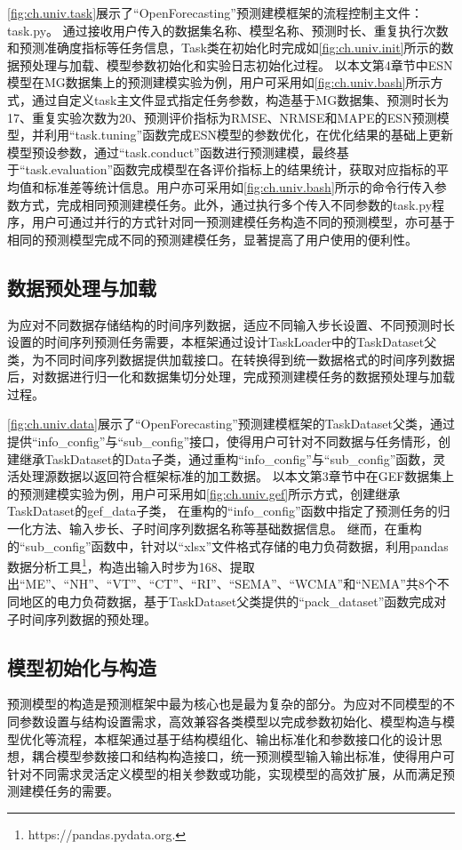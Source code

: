 \autoref{fig:ch.univ.task}展示了“OpenForecasting”预测建模框架的流程控制主文件：task.py。
通过接收用户传入的数据集名称、模型名称、预测时长、重复执行次数和预测准确度指标等任务信息，Task类在初始化时完成如\autoref{fig:ch.univ.init}所示的数据预处理与加载、模型参数初始化和实验日志初始化过程。
以本文第4章节中ESN模型在MG数据集上的预测建模实验为例，用户可采用如\autoref{fig:ch.univ.bash}所示方式，通过自定义task主文件显式指定任务参数，构造基于MG数据集、预测时长为17、重复实验次数为20、预测评价指标为RMSE、NRMSE和MAPE的ESN预测模型，并利用“task.tuning”函数完成ESN模型的参数优化，在优化结果的基础上更新模型预设参数，通过“task.conduct”函数进行预测建模，最终基于“task.evaluation”函数完成模型在各评价指标上的结果统计，获取对应指标的平均值和标准差等统计信息。用户亦可采用如\autoref{fig:ch.univ.bash}所示的命令行传入参数方式，完成相同预测建模任务。此外，通过执行多个传入不同参数的task.py程序，用户可通过并行的方式针对同一预测建模任务构造不同的预测模型，亦可基于相同的预测模型完成不同的预测建模任务，显著提高了用户使用的便利性。

\subsection{数据预处理与加载}
为应对不同数据存储结构的时间序列数据，适应不同输入步长设置、不同预测时长设置的时间序列预测任务需要，本框架通过设计TaskLoader中的TaskDataset父类，为不同时间序列数据提供加载接口。在转换得到统一数据格式的时间序列数据后，对数据进行归一化和数据集切分处理，完成预测建模任务的数据预处理与加载过程。


\autoref{fig:ch.univ.data}展示了“OpenForecasting”预测建模框架的TaskDataset父类，通过提供“info_config”与“sub_config”接口，使得用户可针对不同数据与任务情形，创建继承TaskDataset的Data子类，通过重构“info_config”与“sub_config”函数，灵活处理源数据以返回符合框架标准的加工数据。
以本文第3章节中在GEF数据集上的预测建模实验为例，用户可采用如\autoref{fig:ch.univ.gef}所示方式，创建继承TaskDataset的gef_data子类，
在重构的“info_config”函数中指定了预测任务的归一化方法、输入步长、子时间序列数据名称等基础数据信息。
继而，在重构的“sub_config”函数中，针对以“xlsx”文件格式存储的电力负荷数据，利用pandas数据分析工具\footnote{https://pandas.pydata.org.}，构造出输入时步为168、提取出“ME”、“NH”、“VT”、“CT”、“RI”、“SEMA”、“WCMA”和“NEMA”共8个不同地区的电力负荷数据，基于TaskDataset父类提供的“pack_dataset”函数完成对子时间序列数据的预处理。


\subsection{模型初始化与构造}
预测模型的构造是预测框架中最为核心也是最为复杂的部分。为应对不同模型的不同参数设置与结构设置需求，高效兼容各类模型以完成参数初始化、模型构造与模型优化等流程，本框架通过基于结构模组化、输出标准化和参数接口化的设计思想，耦合模型参数接口和结构构造接口，统一预测模型输入输出标准，使得用户可针对不同需求灵活定义模型的相关参数或功能，实现模型的高效扩展，从而满足预测建模任务的需要。


